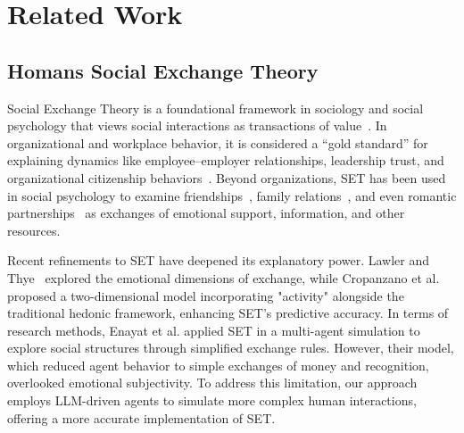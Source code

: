 \section{Related Work}
\subsection{Homans Social Exchange Theory}
Social Exchange Theory is a foundational framework in sociology and social psychology that views social interactions as transactions of value~\cite{homans1958social}. In organizational and workplace behavior, it is considered a “gold standard” for explaining dynamics like employee–employer relationships, leadership trust, and organizational citizenship behaviors~\cite{ahmad2023social}. Beyond organizations, SET has been used in social psychology to examine friendships~\cite{methot2016workplace}, family relations~\cite{cropanzano2005social}, and even romantic partnerships~\cite{laursen1999nature} as exchanges of emotional support, information, and other resources. 

Recent refinements to SET have deepened its explanatory power. Lawler and Thye~\cite{lawler2006social} explored the emotional dimensions of exchange, while Cropanzano et al.\cite{cropanzano2017social} proposed a two-dimensional model incorporating "activity" alongside the traditional hedonic framework, enhancing SET’s predictive accuracy. In terms of research methods, Enayat et al.\cite{enayat2022computational} applied SET in a multi-agent simulation to explore social structures through simplified exchange rules. However, their model, which reduced agent behavior to simple exchanges of money and recognition, overlooked emotional subjectivity. To address this limitation, our approach employs LLM-driven agents to simulate more complex human interactions, offering a more accurate implementation of SET.

